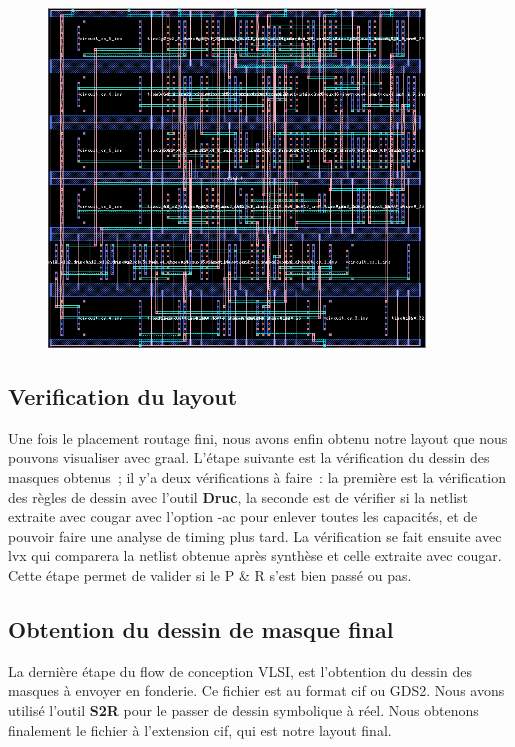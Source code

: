 \documentclass[12pt]{article}
\begin{document}
\begin{figure}
\begin{center}
  \includegraphics[width = 10cm]{pic/route.png}
\end{center}
\end{figure}

\subsection{Verification du layout}
Une fois le placement routage fini, nous avons enfin obtenu notre layout que nous pouvons visualiser avec graal. L'étape suivante est la vérification du dessin des masques obtenus ; il y'a deux vérifications à faire : la première est la vérification des règles de dessin avec l'outil \textbf{Druc}, la seconde est de vérifier si la netlist extraite avec cougar avec l'option -ac pour enlever toutes les capacités, et de pouvoir faire une analyse de timing plus tard. La vérification se fait ensuite avec lvx  qui  comparera la netlist obtenue après synthèse et celle extraite avec cougar. Cette étape permet de valider si le P \& R s'est bien passé ou pas.
\subsection{Obtention du dessin de masque final}
La dernière étape du flow de conception VLSI, est l'obtention du dessin des masques à envoyer en fonderie. Ce fichier est au format cif ou GDS2. Nous avons utilisé l'outil \textbf{S2R} pour le passer de dessin symbolique à réel.  Nous obtenons finalement le fichier à l'extension cif, qui est notre layout final.
\end{document}
